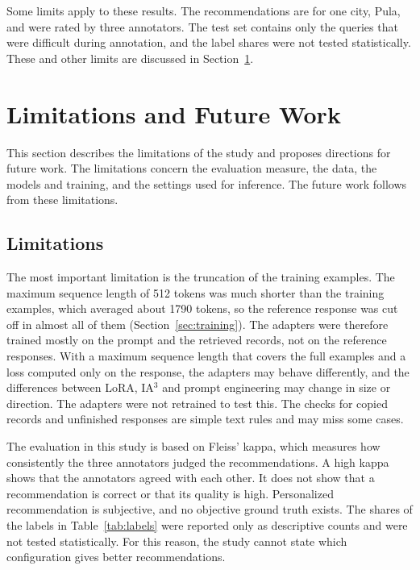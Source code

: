 \documentclass[journal,article,submit,pdftex,moreauthors]{Definitions/mdpi}
\begin{document}
Some limits apply to these results. The recommendations are for one city, Pula, and were rated by three annotators. The test set contains only the queries that were difficult during annotation, and the label shares were not tested statistically. These and other limits are discussed in Section~\ref{sec:limitations}.

\section{Limitations and Future Work}\label{sec:limitations}

This section describes the limitations of the study and proposes directions for future work. The limitations concern the evaluation measure, the data, the models and training, and the settings used for inference. The future work follows from these limitations.

\subsection{Limitations}
The most important limitation is the truncation of the training examples. The maximum sequence length of 512 tokens was much shorter than the training examples, which averaged about 1790 tokens, so the reference response was cut off in almost all of them (Section~\ref{sec:training}). The adapters were therefore trained mostly on the prompt and the retrieved records, not on the reference responses. With a maximum sequence length that covers the full examples and a loss computed only on the response, the adapters may behave differently, and the differences between LoRA, IA$^3$ and prompt engineering may change in size or direction. The adapters were not retrained to test this. The checks for copied records and unfinished responses are simple text rules and may miss some cases.

The evaluation in this study is based on Fleiss' kappa, which measures how consistently the three annotators judged the recommendations. A high kappa shows that the annotators agreed with each other. It does not show that a recommendation is correct or that its quality is high. Personalized recommendation is subjective, and no objective ground truth exists. The shares of the labels in Table~\ref{tab:labels} were reported only as descriptive counts and were not tested statistically. For this reason, the study cannot state which configuration gives better recommendations.
\end{document}

